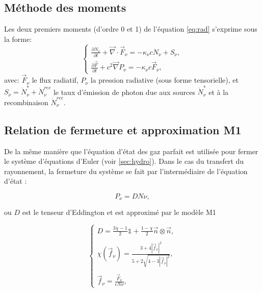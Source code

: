 \subsection{Méthode des moments}
Les deux premiers moments (d'ordre 0 et 1) de l'équation \ref{eq:rad} s'exprime sous la forme:
\begin{equation}
\begin{cases}
\frac{ \partial N_\nu }{ \partial t } + \vec{\nabla} \cdot \vec{F}_\nu = -\kappa_\nu c  N_\nu + S_\nu,\\
\frac{ \partial \vec{F} }{ \partial t } + c^2 \vec{\nabla} P_\nu = -\kappa_\nu c \vec{F}_\nu ,
\end{cases}
\label{eq:densite_energie}
\end{equation}
avec:
$\vec{F}_\nu$ le flux radiatif, 
$P_\nu $ la pression radiative (sous forme tensorielle),
et $S_\nu = \dot{N}_\nu^* + \dot{N}_\nu^{rec}$ le taux d’émission de photon due aux sources $\dot{N}_\nu^*$ et à la recombinaison $ \dot{N}_\nu^{rec}$.

\subsection{Relation de fermeture et approximation M1}

De la même manière que l'équation d'état des gaz parfait est utilisée pour fermer le système d'équations d'Euler (voir \ref{sec:hydro}).
Dans le cas du transfert du rayonnement, la fermeture du système se fait par l'intermédiaire de l’équation d’état :

\begin{equation}
 P_\nu = D N\nu ,
\label{eq:fermeture}
\end{equation}

ou $D$ est le tenseur d’Eddington et est approximé par le modèle M1 \citep{levermore_relating_1984}%

\begin{equation}
\begin{cases}

D = \frac{ 3\chi -1 }{2} \mathbb{1} + \frac{ 1 - \chi }{2} \vec{n} \otimes \vec{n} , \\
\\
\chi(\vec{f}_\nu) = \frac{ 3+4 |\vec{f}_\nu|^2 }{5+2\sqrt{4-3|\vec{f}_\nu|^2}} , \\
\\
\vec{f}_\nu = \frac{ \vec{F}_\nu }{c N\nu }  ,

\end{cases}
\label{eq:tenseur}
\end{equation}


